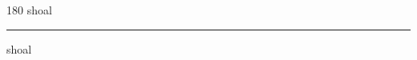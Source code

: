 
\begin{frame}
\begin{center}
\begin{turn}{180}
{\fontsize{2.5cm}{1em}\selectfont shoal}
\end{turn}
\vspace{1em}\par  
\hrule
\vspace{1em}\par  
{\fontsize{2.5cm}{1em}\selectfont shoal}
\end{center}
\end{frame}

